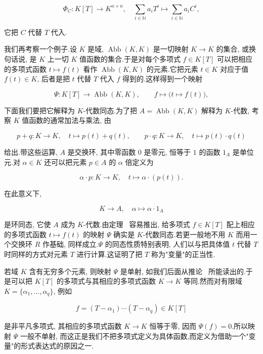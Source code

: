 \[
\varPhi_C \colon K[T] \longrightarrow K^{n \times n}, \quad \sum_{i \in \mathbb{N}} a_i T^i \longmapsto \sum_{i \in \mathbb{N}} a_i C^i,
\]

它把 $C$ 代替 $T$ 代入.

我们再考察一个例子.设 $K$ 是域, $\operatorname{Abb}(K, K)$ 是一切映射 $K \longrightarrow K$ 的集合, 或换句话说, 是 $K$ 上一切 $K$ 值函数的集合.于是对每个多项式 $f \in K[T]$ 可以把相应的多项式函数 $t \longmapsto f(t)$ 看作 $\operatorname{Abb}(K, K)$ 的元素.它把元素 $t \in K$ 对应于值 $f(t) \in K$, 后者是把 $t$ 代替 $T$ 代入 $f$ 得到的.这样得到一个映射

\[
\varPsi \colon K[T] \longrightarrow \operatorname{Abb}(K, K), \qquad f \longmapsto \bigl(t \longmapsto f(t)\bigr),
\]

下面我们要把它解释为 $K$-代数同态.为了把 $A = \operatorname{Abb}(K, K)$ 解释为 $K$-代数, 考察 $K$ 值函数的通常加法与乘法, 由

\[
p + q \colon K \longrightarrow K, \quad t \longmapsto p(t) + q(t), \qquad
p \cdot q \colon K \longrightarrow K, \quad t \longmapsto p(t) \cdot q(t)
\]

给出.带这些运算, $A$ 是交换环, 其中零函数 $0$ 是零元, 恒等于 $1$ 的函数 $1_A$ 是单位元.对 $\alpha \in K$ 还可以把元素 $p \in A$ 的 $\alpha$ 倍定义为

\[
\alpha \cdot p \colon K \longrightarrow K, \quad t \longmapsto \alpha \cdot (p(t))\text{.}
\]

在此意义下,

\[
K \longrightarrow A, \quad \alpha \longmapsto \alpha \cdot 1_A
\]

是环同态, 它使 $A$ 成为 $K$-代数.由定理~ 容易推出, 给多项式 $f \in K[T]$ 配上相应的多项式函数 $t \longmapsto f(t)$ 的映射 $\varPsi$ 确实是 $K$-代数同态.若更一般地不用 $K$ 而用一个交换环 $R$ 作基础, 同样成立.$\varPsi$ 的同态性质特别表明, 人们以与把具体值 $t$ 代替 $T$ 时同样的方式对元素 $T$ 进行计算.这证明了把 $T$ 称为"变量"的正当性.

若域 $K$ 含有无穷多个元素, 则映射 $\varPsi$ 是单射, 如我们后面从推论~ 所能读出的.于是可以把 $K[T]$ 的多项式与其相应的多项式函数 $K \longrightarrow K$ 等同.然而对有限域 $K = \{\alpha_1, \ldots, \alpha_q\}$, 例如

\[
f = (T - \alpha_1) \cdots (T - \alpha_q) \in K[T]
\]

是非平凡多项式, 其相应的多项式函数 $K \longrightarrow K$ 恒等于零, 因而 $\varPsi(f) = 0$.所以映射 $\varPsi$ 一般不单射, 而这正是我们不把多项式定义为具体函数,而定义为借助一个"变量"的形式表达式的原因之一.

